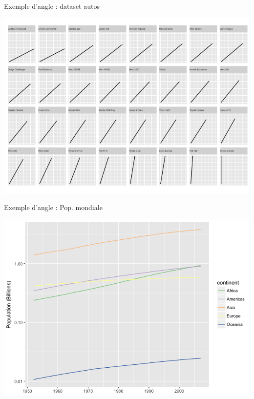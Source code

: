 \documentclass[french]{beamer}
\begin{document}
\begin{frame}{Exemple d'angle : dataset autos}
\begin{center}
	\includegraphics[height=0.8\textheight]{autosangle}
\end{center}
\end{frame}

\begin{frame}{Exemple d'angle : Pop. mondiale}
\begin{center}
	\includegraphics[height=0.8\textheight]{popgrowth}
\end{center}
\end{frame}
\end{document}
